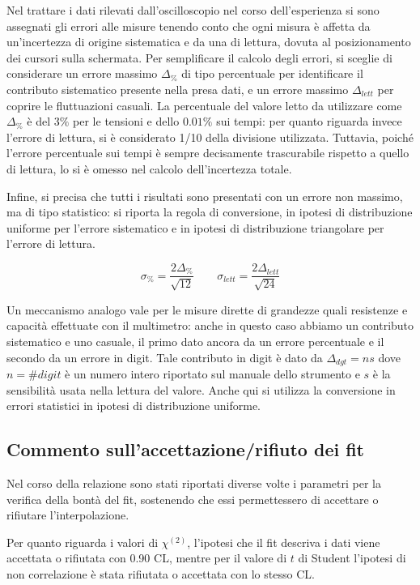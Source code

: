 \documentclass{article}
\begin{document}
Nel trattare i dati rilevati dall'oscilloscopio nel corso dell'esperienza si sono assegnati gli errori alle misure tenendo conto che ogni misura è affetta da un'incertezza di origine sistematica e da una di lettura, dovuta al posizionamento dei cursori sulla schermata. Per semplificare il calcolo degli errori, si sceglie di considerare un errore massimo $\Delta_{\%}$ di tipo percentuale per identificare il contributo sistematico presente nella presa dati, e un errore massimo $\Delta_{lett}$ per coprire le fluttuazioni casuali. La percentuale del valore letto da utilizzare come $\Delta_{\%}$ è del $3\%$ per le tensioni e dello $0.01\%$ sui tempi: per quanto riguarda invece l'errore di lettura, si è considerato 1/10 della divisione utilizzata.
Tuttavia, poiché l'errore percentuale sui tempi è sempre decisamente trascurabile rispetto a quello di lettura, lo si è omesso nel calcolo dell'incertezza totale.

Infine, si precisa che tutti i risultati sono presentati con un errore non massimo, ma di tipo statistico: si riporta la regola di conversione, in ipotesi di distribuzione uniforme per l'errore sistematico e in ipotesi di distribuzione triangolare per l'errore di lettura.

\begin{equation}
\sigma_{\%}=\frac{2\Delta_{\%}}{\sqrt{12}} \quad \quad \sigma_{lett}=\frac{2\Delta_{lett}}{\sqrt{24}}
\end{equation}

Un meccanismo analogo vale per le misure dirette di grandezze quali resistenze e capacità effettuate con il multimetro: anche in questo caso abbiamo un contributo sistematico e uno casuale, il primo dato ancora da un errore percentuale e il secondo da un errore in digit. Tale contributo in digit è dato da $\Delta_{dgt}=ns$ dove $n=\#digit$ è un numero intero riportato sul manuale dello strumento e $s$ è la sensibilità usata nella lettura del valore. Anche qui si utilizza la conversione in errori statistici in ipotesi di distribuzione uniforme.

\subsection{Commento sull'accettazione/rifiuto dei fit}
Nel corso della relazione sono stati riportati diverse volte i parametri per la verifica della bontà del fit, sostenendo che essi permettessero di accettare o rifiutare l'interpolazione.


Per quanto riguarda i valori di $\chi^{(2)}$, l'ipotesi che il fit descriva i dati viene accettata o rifiutata con 0.90 CL, mentre
per il valore di $t$ di Student l'ipotesi di non correlazione è stata rifiutata o accettata con lo stesso CL.
\end{document}
